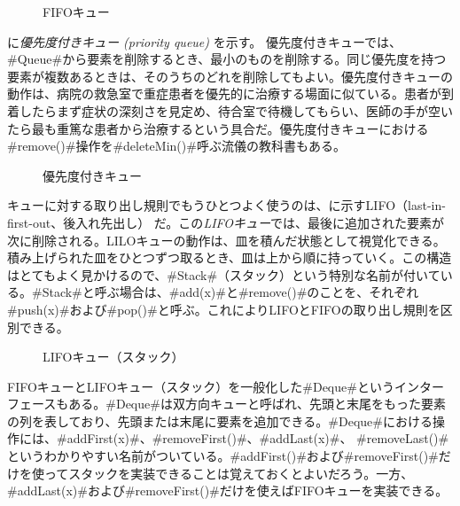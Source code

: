 \begin{figure}
  \caption{FIFOキュー}
\end{figure}

に\emph{優先度付きキュー (priority queue)}%
%
%
%
を示す。
優先度付きキューでは、#Queue#から要素を削除するとき、最小のものを削除する。同じ優先度を持つ要素が複数あるときは、そのうちのどれを削除してもよい。優先度付きキューの動作は、病院の救急室で重症患者を優先的に治療する場面に似ている。患者が到着したらまず症状の深刻さを見定め、待合室で待機してもらい、医師の手が空いたら最も重篤な患者から治療するという具合だ。優先度付きキューにおける#remove()#操作を#deleteMin()#呼ぶ流儀の教科書もある。 %

\begin{figure}
  \caption{優先度付きキュー}
\end{figure}

キューに対する取り出し規則でもうひとつよく使うのは、に示すLIFO（last-in-first-out、後入れ先出し）
%
%
%
%
だ。この\emph{LIFOキュー}では、最後に追加された要素が次に削除される。LILOキューの動作は、皿を積んだ状態として視覚化できる。積み上げられた皿をひとつずつ取るとき、皿は上から順に持っていく。この構造はとてもよく見かけるので、#Stack#（スタック）という特別な名前が付いている。#Stack#と呼ぶ場合は、#add(x)#と#remove()#のことを、それぞれ#push(x)#および#pop()#と呼ぶ。これによりLIFOとFIFOの取り出し規則を区別できる。

\begin{figure}
  \caption{LIFOキュー（スタック）}
\end{figure}

FIFOキューとLIFOキュー（スタック）を一般化した#Deque#というインターフェースもある。#Deque#は双方向キューと呼ばれ、先頭と末尾をもった要素の列を表しており、先頭または末尾に要素を追加できる。#Deque#における操作には、#addFirst(x)#、#removeFirst()#、#addLast(x)#、 #removeLast()#というわかりやすい名前がついている。#addFirst()#および#removeFirst()#だけを使ってスタックを実装できることは覚えておくとよいだろう。一方、#addLast(x)#および#removeFirst()#だけを使えばFIFOキューを実装できる。 %

